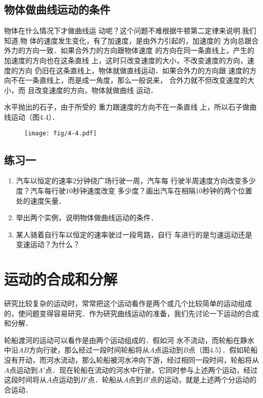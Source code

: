 \subsection{物体做曲线运动的条件}

物体在什么情况下才做曲线运
动呢？这个问题不难根据牛顿第二定律来说明.我们知道,物
体的速度发生变化，有了加速度，是由外力引起的，加速度的
方向总跟合外力的方向一致．如果合外力的方向跟物体速度
的方向在同一条直线上，产生的加速度的方向也在这条直线
上，这时只改变速度的大小，不改变速度的方向，速度的方向
仍旧在这条直线上，物体就做直线运动．如果合外力的方向跟
速度的方向不在一条直线上，而是成一角度，那么一般说来，
合外力就不但改变速度的大小，而
且改变速度的方向，物体就做曲线
运动．

    水平抛出的石子，由于所受的
重力跟速度的方向不在一条直线
上，所以石子做曲线运动（图4.4）．

\begin{figure}[htp]
    \centering
    \texttt{[image: fig/4-4.pdf]}
    \caption{}
    \end{figure}
 
\subsection*{练习一}
\begin{enumerate}
\item 汽车以恒定的速率2分钟绕广场行驶一周，汽车每
行驶半周速度方向改变多少度？汽车每行驶10秒钟速度改变
多少度？画出汽车在相隔10秒钟的两个位置处的速度矢量．
\item 举出两个实例，说明物体做曲线运动的条件．
\item 某人骑着自行车以恒定的速率驶过一段弯路，自行
车进行的是匀速运动还是变速运动？为什么？
\end{enumerate}


\section{运动的合成和分解}
研究比较复杂的运动时，常常把这个运动看作是两个或几个比较简单的运动组成的，使问题变得容易研究．作为研究曲线运动的准备，我们先讨论一下运动的合成和分解．

轮船渡河的运动可以看作是由两个运动组成的．假如河
水不流动，而轮船在静水中沿$AB$方向行驶，那么经过一段时间轮船将从$A$点运动到$B$点（图4.5）．假如轮船没有开动，而河水流动，那么轮船被河水冲向下游，经过相同一段时间，轮船将从$A$点运动到$A'$点．现在轮船在流动的河水中行驶，它同时参与上述两个运动，经过这段时间将从$A$点运动到$B'$点．轮船从$A$点到$B'$点的运动，就是上述两个分运动的合运动．

